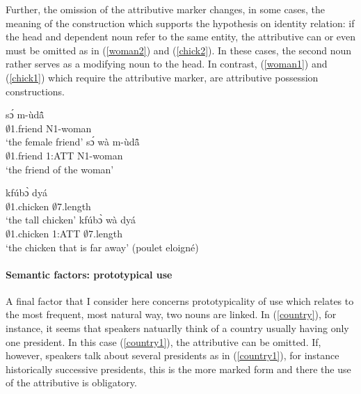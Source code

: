 Further, the omission of the attributive marker changes, in some cases, the meaning of the construction which supports the hypothesis on identity relation: if the head and dependent noun refer to the same entity, the attributive can or even must be omitted as in (\ref{woman2}) and (\ref{chick2}).  In these cases, the second noun rather serves as a modifying noun to the head. In contrast, (\ref{woman1}) and (\ref{chick1}) which require the attributive marker, are attributive possession constructions.

\begin{exe}
\ex\label{woman}
\begin{xlist}
\ex\label{woman2}
 \gll     sɔ́ m-ùdã̂ \\
              $\emptyset$1.friend N1-woman \\
    \trans `the female friend'
\ex \label{woman1}
  \gll    sɔ́ wà m-ùdã̂ \\
               $\emptyset$1.friend 1:ATT N1-woman \\
    \trans `the friend of the woman'
\end {xlist}
\end{exe}

\begin{exe}
\ex\label{chick}
\begin{xlist}
\ex\label{chick2}
 \gll     kfúbɔ̀ dyá \\
            $\emptyset$1.chicken $\emptyset$7.length   \\
    \trans `the tall chicken'
\ex \label{chick1}
  \gll    kfúbɔ̀ wà dyá \\
              $\emptyset$1.chicken 1:ATT $\emptyset$7.length \\
    \trans `the chicken that is far away' (poulet eloigné)
\end {xlist}
\end{exe}

\paragraph{Semantic factors: prototypical use} A final factor that I consider here concerns prototypicality of use which relates to the most frequent, most natural way, two nouns are linked. In (\ref{country}), for instance, it seems that speakers natuarlly think of a country usually having only one president. In this case (\ref{country1}), the attributive can be omitted. If, however, speakers talk about several presidents as in (\ref{country1}), for instance historically successive presidents, this is the more marked form and there the use of the attributive is obligatory.

